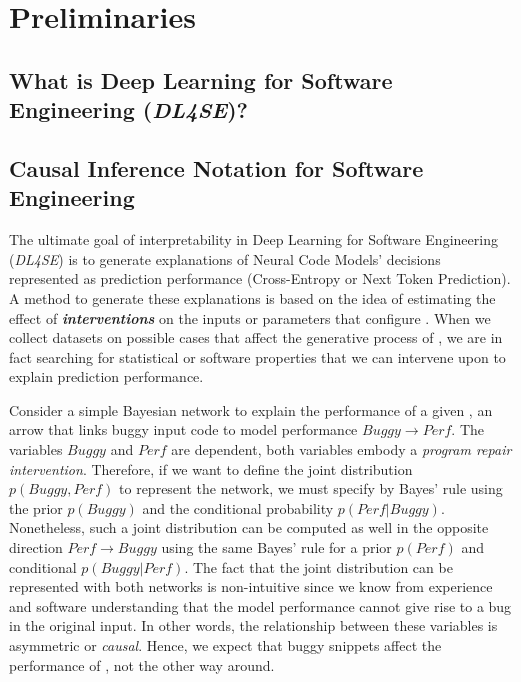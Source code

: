 \chapter{Preliminaries}
\label{ch:preliminaries}

\section{What is Deep Learning for Software Engineering (\textit{DL4SE})?}

\section{Causal Inference Notation for Software Engineering}
\label{sec:pre-ci4se}
The ultimate goal of interpretability in Deep Learning for Software Engineering (\textit{DL4SE}) is to generate explanations of Neural Code Models' decisions represented as prediction performance (\ie Cross-Entropy or Next Token Prediction). A method to generate these explanations is based on the idea of estimating the effect of \textbf{\textit{interventions}} on the inputs or parameters that configure \nlms. When we collect datasets on possible cases that affect the generative process of \nlms, we are in fact searching for statistical or software properties that we can intervene upon to explain prediction performance. 

\begin{exmp}
\label{exmp:association}
Consider a simple Bayesian network to explain the performance of a given \nlm, an arrow that links buggy input code to model performance $Buggy\to Perf$. The variables $Buggy$ and $Perf$ are dependent, both variables embody a \textit{program repair intervention}. Therefore, if we want to define the joint distribution $p(Buggy,Perf)$ to represent the network, we must specify by Bayes' rule using the prior $p(Buggy)$ and the conditional probability $p(Perf|Buggy)$. Nonetheless, such a joint distribution can be computed as well in the opposite direction  $Perf\to Buggy$ using the same Bayes' rule for a prior $p(Perf)$ and conditional $p(Buggy|Perf)$. The fact that the joint distribution can be represented with both networks is non-intuitive since we know from experience and software understanding that the model performance cannot give rise to a bug in the original input. In other words, the relationship between these variables is asymmetric or \textit{causal}. Hence, we expect that buggy snippets affect the performance of \nlms, not the other way around.
\end{exmp}

